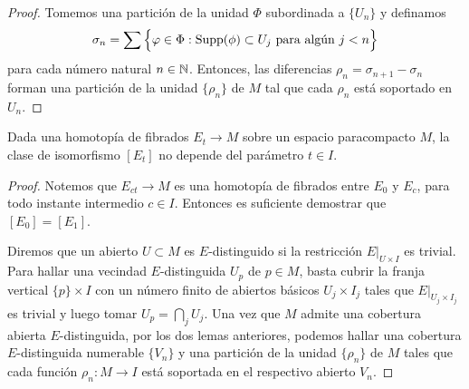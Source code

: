 \begin{proof}
Tomemos una partición de la unidad $\Phi$ subordinada a $\{ U_n \}$ y definamos
$$\sigma_n = \sum \Big \{ \varphi \in \Phi : \operatorname{Supp}(\phi) \subset U_j \text{ para algún } j < n \Big \}$$
para cada número natural $n \in \mathbb N$. Entonces, las diferencias $\rho_n = \sigma_{n+1} - \sigma_n$ forman una partición de la unidad $\{ \rho_n \}$ de $M$ tal que cada $\rho_n$ está soportado en $U_n$.
\end{proof}

\begin{theorem}
Dada una homotopía de fibrados $E_t \to M$ sobre un espacio paracompacto $M$, la clase de isomorfismo $[E_t]$ no depende del parámetro $t \in I$.
\end{theorem}

\begin{proof}
Notemos que $E_{ct} \to M$ es una homotopía de fibrados entre $E_0$ y $E_c$, para todo instante intermedio $c \in I$. Entonces es suficiente demostrar que $[E_0] = [E_1]$.

Diremos que un abierto $U \subset M$ es $E$-distinguido si la restricción $E \vert_{U \times I}$ es trivial. Para hallar una vecindad $E$-distinguida $U_p$ de $p \in M$, basta cubrir la franja vertical $\{ p \} \times I$ con un número finito de abiertos básicos $U_j \times I_j$ tales que $E \vert_{U_j \times I_j}$ es trivial y luego tomar $U_p = \bigcap_j U_j$. Una vez que $M$ admite una cobertura abierta $E$-distinguida, por los dos lemas anteriores, podemos hallar una cobertura $E$-distinguida numerable $\{ V_n \}$ y una partición de la unidad $\{ \rho_n \}$ de $M$ tales que cada función $\rho_n : M \to I$ está soportada en el respectivo abierto $V_n$.


\end{proof}
